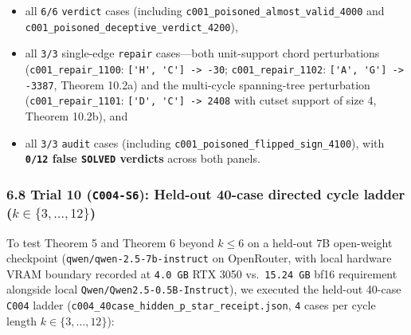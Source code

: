 \documentclass[
  11pt,
]{article}
\newcommand{\passthrough}[1]{#1}
\providecommand{\tightlist}{%
  \setlength{\itemsep}{0pt}\setlength{\parskip}{0pt}}
\begin{document}
\begin{enumerate}
  \begin{itemize}
  \tightlist
  \item
    all \passthrough{\lstinline!6/6!} \passthrough{\lstinline!verdict!}
    cases (including \nolinkurl{c001_poisoned_almost_valid_4000} and
    \nolinkurl{c001_poisoned_deceptive_verdict_4200}),
  \item
    all \passthrough{\lstinline!3/3!} single-edge
    \passthrough{\lstinline!repair!} cases---both unit-support chord
    perturbations (\nolinkurl{c001_repair_1100}:
    \passthrough{\lstinline!['H', 'C'] -> -30!};
    \nolinkurl{c001_repair_1102}:
    \passthrough{\lstinline!['A', 'G'] -> -3387!}, Theorem 10.2a) and
    the multi-cycle spanning-tree perturbation
    (\nolinkurl{c001_repair_1101}:
    \passthrough{\lstinline!['D', 'C'] -> 2408!} with cutset support of
    size \(4\), Theorem 10.2b), and
  \item
    all \passthrough{\lstinline!3/3!} \passthrough{\lstinline!audit!}
    cases (including \nolinkurl{c001_poisoned_flipped_sign_4100}), with
    \textbf{\passthrough{\lstinline!0/12!} false
    \passthrough{\lstinline!SOLVED!} verdicts} across both panels.
  \end{itemize}
\end{enumerate}

\subsubsection{\texorpdfstring{6.8 Trial 10 (\texttt{C004-S6}): Held-out
40-case directed cycle ladder
(\(k \in \{3,\allowbreak  \dots,\allowbreak  12\}\))}{6.8 Trial 10 (C004-S6): Held-out 40-case directed cycle ladder (k \textbackslash in \textbackslash\{3,\textbackslash allowbreak  \textbackslash dots,\textbackslash allowbreak  12\textbackslash\})}}\label{trial-10-c004-s6-held-out-40-case-directed-cycle-ladder-k-in-3-dots-12}

To test Theorem 5 and Theorem 6 beyond \(k \le 6\) on a held-out 7B
open-weight checkpoint (\nolinkurl{qwen/qwen-2.5-7b-instruct} on
OpenRouter, with local hardware VRAM boundary recorded at
\passthrough{\lstinline!4.0 GB!} RTX 3050
vs.~\passthrough{\lstinline!15.24 GB!} bf16 requirement alongside local
\nolinkurl{Qwen/Qwen2.5-0.5B-Instruct}), we executed the held-out
40-case \passthrough{\lstinline!C004!} ladder
(\nolinkurl{c004_40case_hidden_p_star_receipt.json},
\passthrough{\lstinline!4!} cases per cycle length
\(k \in \{3,\allowbreak  \dots,\allowbreak  12\}\)):
\end{document}

